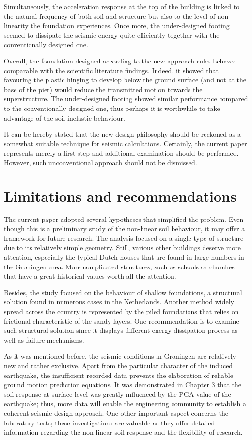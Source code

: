  
 Simultaneously, the acceleration response at the top of the building is linked to the natural frequency of both soil and structure but also to the level of non-linearity the foundation experiences. Once more, the under-designed footing seemed to dissipate the seismic energy quite efficiently together with the conventionally designed one. 
 
 Overall, the foundation designed according to the new approach rules behaved comparable with the scientific literature findings. Indeed, it showed that favouring the plastic hinging to develop below the ground surface (and not at the base of the pier) would reduce the transmitted motion towards the superstructure. The under-designed footing showed similar performance compared to the conventionally designed one, thus perhaps it is worthwhile to take advantage of the soil inelastic behaviour.
 
 It can be hereby stated that the new design philosophy should be reckoned as a somewhat suitable technique for seismic calculations. Certainly, the current paper represents merely a first step and additional examination should be performed. However, such unconventional approach should not be dismissed. 
 
 \newpage
\section{Limitations and recommendations}
The current paper adopted several hypotheses that simplified the problem. Even though this is a preliminary study of the non-linear soil behaviour, it may offer a framework for future research. The analysis focused on a single type of structure due to its relatively simple geometry. Still, various other buildings deserve more attention, especially the typical Dutch houses that are found in large numbers in the Groningen area. More complicated structures, such as schools or churches that have a great historical values worth all the attention. 

Besides, the study focused on the behaviour of shallow foundations, a structural solution found in numerous cases in the Netherlands. Another  method widely spread across the country is represented by the piled foundations that relies on frictional characteristic of  the sandy layers. One recommendation is to examine such structural solution since it displays different energy dissipation process as well as failure mechanisms.

As it was mentioned before, the seismic conditions in Groningen are relatively new and rather exclusive. Apart from the particular character of the induced earthquake, the insufficient recorded data prevents the elaboration of reliable ground motion prediction equations. It was demonstrated in Chapter 3 that the soil response at surface level was greatly influenced by the PGA value of the earthquake; thus, more data will enable the engineering community to establish a coherent seismic design approach. One other important aspect concerns the laboratory tests; these investigations are valuable as they offer detailed information regarding the non-linear soil response and the flexibility of research.

